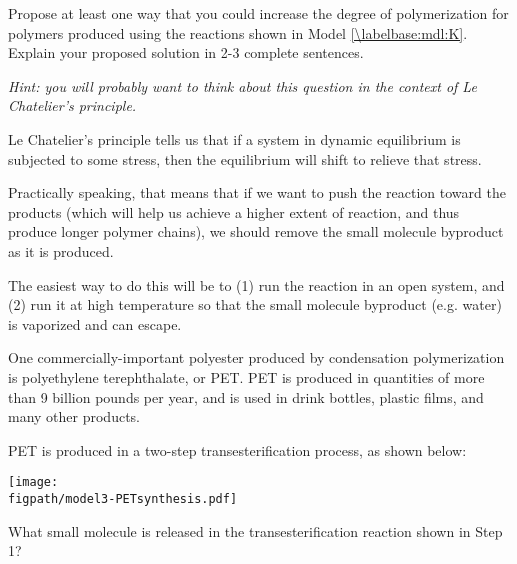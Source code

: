 \begin{activity}
\begin{ctqs}
\begin{solution}[2in]
			\end{solution}
			
		\question Propose at least one way that you could increase the degree of polymerization for polymers produced using the reactions shown in Model \ref{\labelbase:mdl:K}.  Explain your proposed solution in 2-3 complete sentences.
		
			\emph{Hint: you will probably want to think about this question in the context of Le Chatelier's principle.}
		
			\begin{solution}[2.5in]
			
				Le Chatelier's principle tells us that if a system in dynamic equilibrium is subjected to some stress, then the equilibrium will shift to relieve that stress.
				
				Practically speaking, that means that if we want to push the reaction toward the products (which will help us achieve a higher extent of reaction, and thus produce longer polymer chains), we should remove the small molecule byproduct as it is produced.
				
				The easiest way to do this will be to (1) run the reaction in an open system, and (2) run it at high temperature so that the small molecule byproduct (e.g. water) is vaporized and can escape.
			
			\end{solution}
		
\end{ctqs}

\clearpage
\begin{model}
\label{\labelbase:mdl:PET}

One commercially-important polyester produced by condensation polymerization is polyethylene terephthalate, or PET.
PET is produced in quantities of more than 9 billion pounds per year, and is used in drink bottles, plastic films, and many other products.

PET is produced in a two-step transesterification process, as shown below:
	
		\vspace{0.1in}
		\centerline{\texttt{[image: \\figpath/model3-PETsynthesis.pdf]}}

\end{model}

\begin{ctqs}
		

			
		\question What small molecule is released in the transesterification reaction shown in Step 1?
		

\end{ctqs}
\end{activity}
